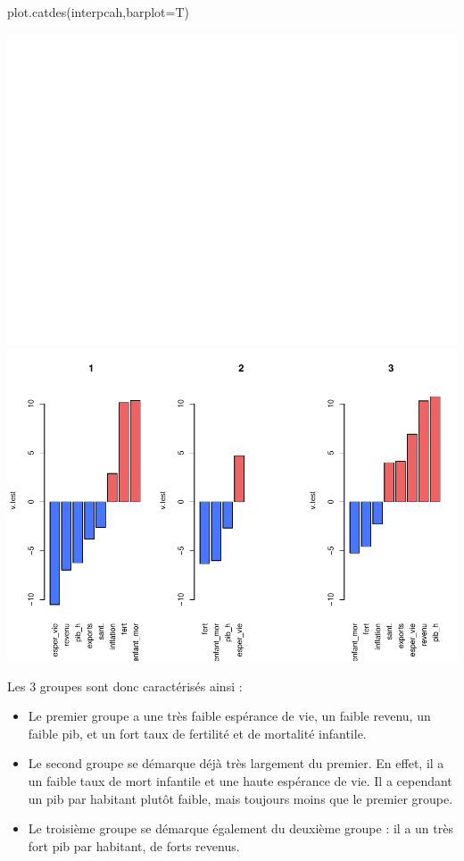 \documentclass[
]{article}
\newenvironment{Shaded}{}{}
\newcommand{\AttributeTok}[1]{#1}
\newcommand{\FunctionTok}[1]{#1}
\newcommand{\NormalTok}[1]{#1}
\begin{document}
\begin{Shaded}
\begin{Highlighting}[]
\FunctionTok{plot.catdes}\NormalTok{(interpcah,}\AttributeTok{barplot=}\NormalTok{T)}
\end{Highlighting}
\end{Shaded}

\includegraphics{Projet_files/figure-latex/unnamed-chunk-28-1.pdf}
\includegraphics{Projet_files/figure-latex/unnamed-chunk-28-2.pdf}

Les 3 groupes sont donc caractérisés ainsi :

\begin{itemize}
\item
  Le premier groupe a une très faible espérance de vie, un faible
  revenu, un faible pib, et un fort taux de fertilité et de mortalité
  infantile.
\item
  Le second groupe se démarque déjà très largement du premier. En effet,
  il a un faible taux de mort infantile et une haute espérance de vie.
  Il a cependant un pib par habitant plutôt faible, mais toujours moins
  que le premier groupe.
\item
  Le troisième groupe se démarque également du deuxième groupe : il a un
  très fort pib par habitant, de forts revenus.
\end{itemize}
\end{document}
